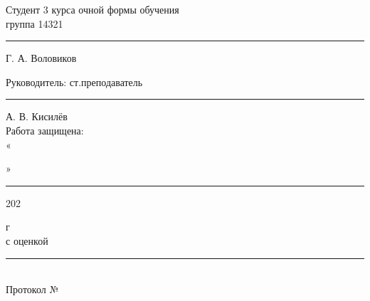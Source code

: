 \noindent
\begin{minipage}[t]{0.5\textwidth}
  \begin{flushleft}
  \linespread{1}

		
		
		\end{flushleft}
\end{minipage}%
\begin{minipage}[t]{0.5\textwidth}
  \begin{flushleft}
  \linespread{1}
	\small{
    Студент 3 курса
	очной формы обучения \\
  группа 14321\\
        \rule{1,8cm}{0,1pt} Г. А. Воловиков\\
	\vspace{2em}
		
	Руководитель: ст.преподаватель\\
            \rule{1,8cm}{0,1pt} А. В. Кисилёв\\
\vspace{2em}
 Работа защищена:\\
        «\rule{0,9cm}{0,1pt}»\rule{2,7cm}{0,1pt} 202\,\rule{0,2cm}{0,1pt} г \\
с оценкой \rule{1,8cm}{0,1pt}\\
Протокол № \rule{0,9cm}{0,1pt}}
		
		
		\end{flushleft}
\end{minipage}

    \vfill
    
\newpage